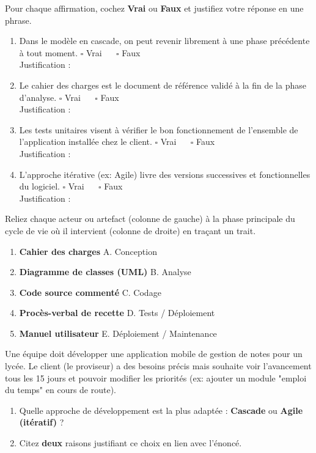 \documentclass[11pt]{article}
\begin{document}
\begin{exercice}
\label{exo:vf}
Pour chaque affirmation, cochez \textbf{Vrai} ou \textbf{Faux} et justifiez votre réponse en une phrase.
\begin{enumerate}
    \item Dans le modèle en cascade, on peut revenir librement à une phase précédente à tout moment. \hfill $\square$ Vrai $\quad$ $\square$ Faux \\
    Justification : \dotfill
    \item Le cahier des charges est le document de référence validé à la fin de la phase d'analyse. \hfill $\square$ Vrai $\quad$ $\square$ Faux \\
    Justification : \dotfill
    \item Les tests unitaires visent à vérifier le bon fonctionnement de l'ensemble de l'application installée chez le client. \hfill $\square$ Vrai $\quad$ $\square$ Faux \\
    Justification : \dotfill
    \item L'approche itérative (ex: Agile) livre des versions successives et fonctionnelles du logiciel. \hfill $\square$ Vrai $\quad$ $\square$ Faux \\
    Justification : \dotfill
\end{enumerate}
\end{exercice}

\begin{exercice}
\label{exo:corresp}
Reliez chaque acteur ou artefact (colonne de gauche) à la phase principale du cycle de vie où il intervient (colonne de droite) en traçant un trait.
\begin{enumerate}
    \item \textbf{Cahier des charges} \hfill A. Conception
    \item \textbf{Diagramme de classes (UML)} \hfill B. Analyse
    \item \textbf{Code source commenté} \hfill C. Codage
    \item \textbf{Procès-verbal de recette} \hfill D. Tests / Déploiement
    \item \textbf{Manuel utilisateur} \hfill E. Déploiement / Maintenance
\end{enumerate}
\end{exercice}

\begin{exercice}
\label{exo:cas}
Une équipe doit développer une application mobile de gestion de notes pour un lycée. Le client (le proviseur) a des besoins précis mais souhaite voir l'avancement tous les 15 jours et pouvoir modifier les priorités (ex: ajouter un module "emploi du temps" en cours de route).
\begin{enumerate}
    \item Quelle approche de développement est la plus adaptée : \textbf{Cascade} ou \textbf{Agile (itératif)} ?
    \item Citez \textbf{deux} raisons justifiant ce choix en lien avec l'énoncé.
\end{enumerate}
\end{exercice}
\end{document}
